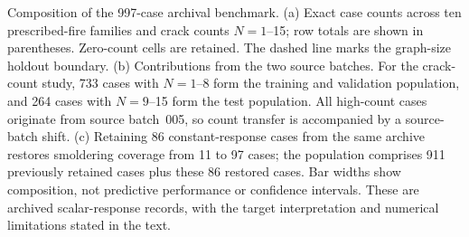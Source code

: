 Composition of the 997-case archival benchmark. (a) Exact case counts across ten prescribed-fire families and crack counts $N=1$--15; row totals are shown in parentheses. Zero-count cells are retained. The dashed line marks the graph-size holdout boundary. (b) Contributions from the two source batches. For the crack-count study, 733 cases with $N=1$--8 form the training and validation population, and 264 cases with $N=9$--15 form the test population. All high-count cases originate from source batch~005, so count transfer is accompanied by a source-batch shift. (c) Retaining 86 constant-response cases from the same archive restores smoldering coverage from 11 to 97 cases; the population comprises 911 previously retained cases plus these 86 restored cases. Bar widths show composition, not predictive performance or confidence intervals. These are archived scalar-response records, with the target interpretation and numerical limitations stated in the text.
